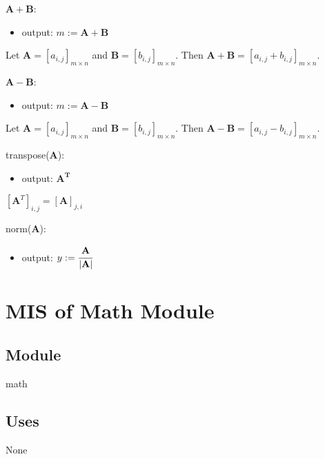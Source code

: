 \documentclass[12pt, titlepage]{article}
\begin{document}
\noindent $\mathbf{A} + \mathbf{B}$:
\begin{itemize}
\item output: $m:= \mathbf{A} + \mathbf{B}$
\end{itemize}
Let $\mathbf{A} = [a_{i,j}]_{m \times n}$ and $\mathbf{B} = [b_{i,j}]_{m \times n}$. Then
$\mathbf{A} + \mathbf{B} = [a_{i,j} + b_{i,j}]_{m \times n}$.
\newline

\noindent $\mathbf{A} - \mathbf{B}$:
\begin{itemize}
\item output: $m:= \mathbf{A} - \mathbf{B}$
\end{itemize}
Let $\mathbf{A} = [a_{i,j}]_{m \times n}$ and $\mathbf{B} = [b_{i,j}]_{m \times n}$. Then
$\mathbf{A} - \mathbf{B} = [a_{i,j} - b_{i,j}]_{m \times n}$.
\newline

\noindent transpose($\mathbf{A}$):
\begin{itemize}
\item output: $\mathbf{A^T}$
\end{itemize}
$[\mathbf{A}^T]_{i,j} = [\mathbf{A}]_{j,i}$
\newline

\noindent norm($\mathbf{A}$):
\begin{itemize}
\item output: $y:= \cfrac{\mathbf{A}}{|\mathbf{A}|}$
\end{itemize}

\newpage

\section{MIS of Math Module} \label{mm}

\subsection{Module}
math

\subsection{Uses}
None
\end{document}
